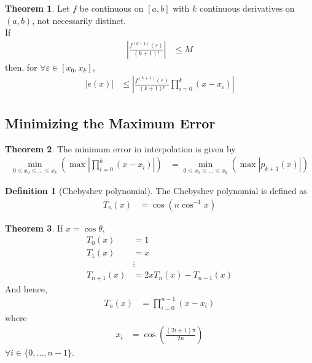\documentclass[fleqn, a4paper, 12pt, twoside, titlepage]{article}
\theoremstyle{definition}
\newtheorem{definition}{Definition}
\theoremstyle{theorem}
\newtheorem{theorem}{Theorem}
\begin{document}
\begin{theorem}
	Let $f$ be continuous on $[a,b]$ with $k$ continuous derivatives on $(a,b)$, not necessarily distinct.\\
	If
	\begin{align*}
		\left| \frac{f^{(k + 1)}(\varepsilon)}{(k + 1)!} \right| &\le M
	\end{align*}
	then, for $\forall \varepsilon \in [x_0,x_k]$,
	\begin{align*}
		\left| e(x) \right| &\le \left| \frac{f^{(k + 1)}(\varepsilon)}{(k + 1)!} \prod\limits_{i = 0}^{k} (x - x_i) \right|
	\end{align*}
\end{theorem}

\subsection{Minimizing the Maximum Error}

\begin{theorem}
	The minimum error in interpolation is given by
	\begin{align*}
		\min\limits_{0 \le x_0 \le \dots \le x_k} \left( \max\left| \prod\limits_{i = 0}^{k} (x - x_i) \right| \right) &= \min\limits_{0 \le x_0 \le \dots \le x_k} \left( \max\left| p_{k + 1}(x) \right| \right)
	\end{align*}
\end{theorem}

\begin{definition}[Chebyshev polynomial]
	The Chebyshev polynomial is defined as
	\begin{align*}
		T_n(x) &= \cos(n \cos^{-1} x)
	\end{align*}
\end{definition}

\begin{theorem}
	If $x = \cos \theta$,
	\begin{align*}
		T_0(x) &= 1\\
		T_1(x) &= x\\
		&\vdots\\
		T_{n + 1}(x) &= 2 x T_n(x) - T_{n - 1}(x)
	\end{align*}
	And hence,
	\begin{align*}
		T_n(x) &= \prod\limits_{i = 0}^{n - 1} (x - x_i)
	\end{align*}
	where
	\begin{align*}
		x_i &= \cos\left( \frac{(2 i + 1) \pi}{2 n} \right)
	\end{align*}
	$\forall i \in \{0,\dots,n - 1\}$.
\end{theorem}
\end{document}
